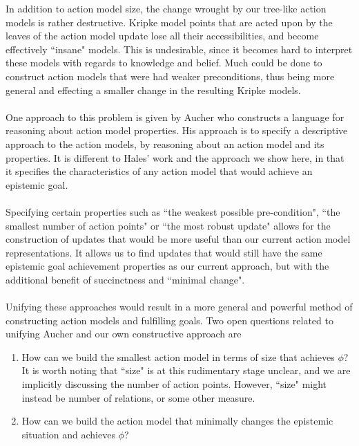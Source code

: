 In addition to action model size, the change wrought by our tree-like action
models is rather destructive.
Kripke model points that are acted upon by the leaves of the action model update
lose all their accessibilities, and become effectively ``insane" models.
This is undesirable, since it becomes hard to interpret these models with
regards to knowledge and belief.
Much could be done to construct action models that were had weaker
preconditions, thus being more general and effecting a smaller change in the
resulting Kripke models.\\
\\
One approach to this problem is given by Aucher \cite{doi:10.3166/jancl.21.289-321,doi:10.1080/11663081.2012.736703}
who constructs a language for reasoning about action model properties.
His approach is to specify a descriptive approach to the action models, by
reasoning about an action model and its properties.
It is different to Hales' work and the approach we show here, in that it
specifies the characteristics of any action model that would achieve an
epistemic goal.\\
\\
Specifying certain properties such as ``the weakest possible pre-condition",
``the smallest number of action points" or ``the most robust update" allows for
the construction of updates that would be more useful than our
current action model representations.
It allows us to find updates that would still have the same epistemic goal
achievement properties as our current approach, but with the additional benefit
of succinctness and ``minimal change".\\
\\
Unifying these approaches would result in a more general and powerful method of constructing action
models and fulfilling goals.
Two open questions related to unifying Aucher and our own constructive approach are
\begin{enumerate}
	\item How can we build the smallest action model in terms of size that achieves $\phi$?
		It is worth noting that ``size" is at this rudimentary stage unclear, and we are implicitly discussing the
		number of action points.
		However, ``size" might instead be number of relations, or some other measure.
	\item How can we build the action model that minimally changes the epistemic situation and achieves
		$\phi$?
\end{enumerate}



